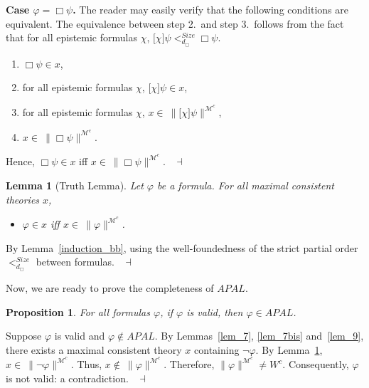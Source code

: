 \documentclass{article}[12pt]
\newtheorem{lemma}{Lemma}
\newtheorem{proposition}{Proposition}
\newenvironment{proof}{\noindent {\bf Proof \ }}{\hfill ~$\dashv$}
\renewcommand{\phi}{\varphi}
\begin{document}
\begin{proof}
\medskip \noindent 
{\bf Case $\phi=\Box\psi$.}
The reader may easily verify that the following conditions are equivalent.
The equivalence between step 2.\ and step 3.\ follows from the fact that for all epistemic formulas $\chi$, $\lbrack\chi\rbrack\psi<^{Size}_{d_{\Box}}\Box\psi$.
\begin{enumerate}
\item $\Box\psi\in x$,
\item for all epistemic formulas $\chi$, $\lbrack\chi\rbrack\psi\in x$,
\item for all epistemic formulas $\chi$, $x\in \ \parallel\lbrack\chi\rbrack\psi\parallel^{\mathcal{M}^{c}}$,
\item $x\in \ \parallel\Box\psi\parallel^{\mathcal{M}^{c}}$.
\end{enumerate}
Hence, $\Box\psi\in x$ iff $x\in \ \parallel\Box\psi\parallel^{\mathcal{M}^{c}}$.
\end{proof}
\begin{lemma}[Truth Lemma] \label{equ_sem}
Let $\phi$ be a formula.
For all maximal consistent theories $x$,
\begin{itemize}
\item $\phi\in x$ iff $x\in \ \parallel\phi\parallel^{\mathcal{M}^{c}}$.
\end{itemize}
\end{lemma}
\begin{proof}
By Lemma~\ref{induction_bb}, using the well-foundedness of the strict partial order $<^{Size}_{d_{\Box}}$ between formulas.
\end{proof}


\medskip

\noindent Now, we are ready to prove the completeness of $APAL$.
\begin{proposition}\label{pro_complete}
For all formulas $\phi$, if $\phi$ is valid, then $\phi\in APAL$.
\end{proposition}
\begin{proof}
Suppose $\phi$ is valid and $\phi\not\in APAL$.
By Lemmas~\ref{lem_7}, \ref{lem_7bis} and~\ref{lem_9}, there exists a maximal consistent theory $x$ containing $\neg\phi$.
By Lemma~\ref{equ_sem}, $x\in \ \parallel\neg\phi\parallel^{\mathcal{M}^{c}}$.
Thus, $x\not\in \ \parallel\phi\parallel^{\mathcal{M}^{c}}$.
Therefore, $\parallel\phi\parallel^{\mathcal{M}^{c}}\not=W^{c}$.
Consequently, $\phi$ is not valid: a contradiction.
\end{proof}
\end{document}
